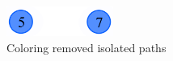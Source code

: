 {\begin{columns}
\begin{column}{0.5\textwidth}
\begin{center}
\begin{textblock*}{8cm}
          \begin{figure}
            \centering
            \includegraphics[width=3.5cm]{../figures/algorithm1-slide-5.pdf}
            \caption*{Coloring removed isolated paths}
          \end{figure}
        \end{textblock*}
      \end{center}
    \end{column}
  \end{columns}
}

